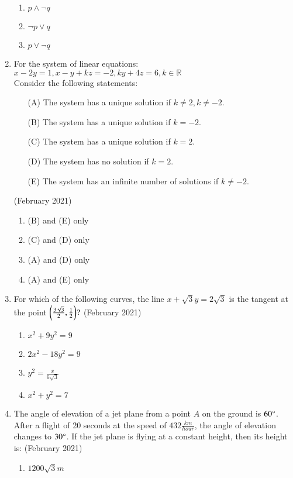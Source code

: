 \documentclass[journal,12pt,onecolumn]{IEEEtran}
\theoremstyle{remark}
\begin{document}
\begin{enumerate}
\begin{enumerate}
        \item $p \land \neg q$
        \item $\neg p \lor q$
        \item $p \lor \neg q$
    \end{enumerate}
    \item For the system of linear equations:$x-2y = 1, x-y + kz = -2, ky + 4z = 6,k \in \mathbb{R}$\\
    Consider the following statements:
    \begin{enumerate}
    \item[(A)] The system has a unique solution if $k \neq 2, k \neq -2 $.
    \item[(B)] The system has a unique solution if $ k = -2 $.
    \item[(C)] The system has a unique solution if $k = 2 $.
    \item[(D)] The system has no solution if $ k = 2$.
    \item[(E)] The system has an infinite number of solutions if $ k \neq -2$.
    \end{enumerate}
    \hfill{(February 2021)}
    \begin{enumerate}
    \item (B) and (E) only
    \item (C) and (D) only
    \item (A) and (D) only
    \item (A) and (E) only
    \end{enumerate}
\item For which of the following curves, the line $x + \sqrt{3}y = 2\sqrt{3} $ is the tangent at the point $\left(\frac{3\sqrt{3}}{2}, \frac{1}{2}\right)?$
\hfill{(February 2021)} 
\begin{enumerate}
    \item $x^2+9y^2=9$
    \item $2x^2-18y^2=9$
    \item $y^2=\frac{x}{6\sqrt{3}}$
    \item $x^2+y^2=7$
\end{enumerate}
\item The angle of elevation of a jet plane from a point $A$ on the ground is $60\degree$. After a flight of 20 seconds at the speed of $432 \frac{km}{hour}$, the angle of elevation changes to $30\degree$. If the jet plane is flying at a constant height, then its height is:
\hfill{(February 2021)} 
\begin{enumerate}
    \item $1200\sqrt{3}m$

\end{enumerate}
\end{enumerate}
\end{document}
